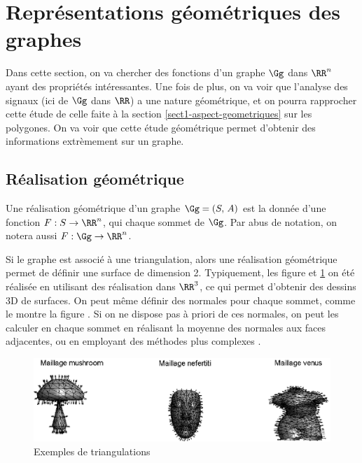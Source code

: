 \section{Représentations géométriques des graphes}
\label{sect1-representations-geometriques} 

Dans cette section, on va chercher des fonctions d'un graphe $\Gg$ dans $\RR^n$ ayant des propriétés intéressantes. Une fois de plus, on va voir que l'analyse des signaux (ici de $\Gg$ dans $\RR$) a une nature géométrique, et on pourra rapprocher cette étude de celle faite à la section \ref{sect1-aspect-geometriques} sur les polygones. On va voir que cette étude géométrique permet d'obtenir des informations extrèmement  sur un graphe.
\subsection{Réalisation géométrique}
\label{sect2-realisation-geometrique} 



\mathspace{}
\begin{defn}
Une réalisation géométrique d'un graphe $\Gg = (S,\,A)$ est la donnée d'une fonction $F : S \rightarrow\RR^n$, qui  chaque sommet de $\Gg$. Par abus de notation, on notera aussi $F : \Gg \rightarrow \RR^n$.
\end{defn}\noindent


\paraspace
Si le graphe est associé à une triangulation, alors une réalisation géométrique permet de définir une surface de dimension 2. Typiquement, les figure  et \ref{fig-graph-examples-meshes-normal} on été réalisée en utilisant des réalisation dans $\RR^3$, ce qui permet d'obtenir des dessins 3D de surfaces. On peut même définir des normales pour chaque sommet, comme le montre la figure . Si on ne dispose pas à priori de ces normales, on peut les calculer en chaque sommet en réalisant la moyenne des normales aux faces adjacentes, ou en employant des méthodes plus complexes \cite{cohen-normal-cycles}.\begin{figure}[ht] 
    \begin{center}
    \includegraphics[scale=0.7]{images/graph-examples-meshes-normal.eps}
    \end{center}
    \caption{Exemples de triangulations}
	 \label{fig-graph-examples-meshes-normal}
\end{figure}


